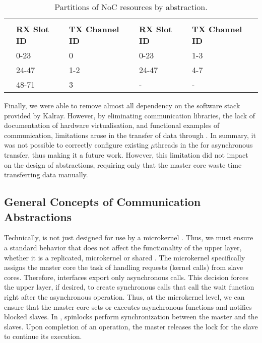 			\begin{table}[!tb]
				\centering%
				\caption{Partitions of NoC resources by abstraction.}%
				\label{tab.noc-resources}%

				\begin{tabular}{l|l|l|l|l|}
					\cline{2-5}
															& \multicolumn{2}{c|}{\textbf{\cnoc}}          & \multicolumn{2}{c|}{\textbf{\dnoc}}          \\ \cline{2-5}
															& \textbf{RX Slot ID} & \textbf{TX Channel ID} & \textbf{RX Slot ID} & \textbf{TX Channel ID} \\ \hline
					\multicolumn{1}{|l|}{\textbf{\mailbox}} & 0-23                & 0                      & 0-23                & 1-3                    \\ \hline
					\multicolumn{1}{|l|}{\textbf{\portal}}  & 24-47               & 1-2                    & 24-47               & 4-7                    \\ \hline
					\multicolumn{1}{|l|}{\textbf{\sync}}    & 48-71               & 3                      & -                   & -                      \\ \hline
				\end{tabular}

			\end{table}

			Finally, we were able to remove almost all dependency on the software
			stack provided by Kalray. However, by eliminating communication
			libraries, the lack of documentation of hardware virtualisation,
			and functional examples of communication, limitations arose
			in the transfer of data through \dnoc. In summary, it was not possible
			to correctly configure existing $\mu$threads in the \dma for asynchronous
			transfer, thus making it a future work. However, this limitation did not
			impact on the design of abstractions, requiring only that the master
			core waste time transferring data manually.

		\subsection{General Concepts of Communication Abstractions}
		\label{sec.general-concepts}

			Technically, \nanvixhal is not just designed for use by a
			microkernel \os. Thus, we must ensure a standard behavior
			that does not affect the functionality of the upper layer,
			whether it is a replicated, microkernel or shared \os. The
			microkernel specifically assigns the master core the task
			of handling requests (\ie kernel calls) from slave cores. Therefore,
			interfaces export only asynchronous calls. This decision forces
			the upper layer, if desired, to create synchronous calls that
			call the wait function right after the asynchronous operation.
			Thus, at the microkernel level, we can ensure that the
			master core
			sets or executes asynchronous functions and notifies blocked
			slaves. In \mppa, spinlocks perform synchronization between the
			master and the slaves. Upon completion of an operation, the master
			releases the lock for the slave to continue its execution.

